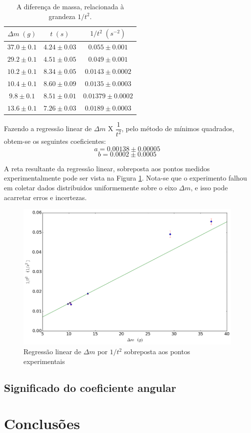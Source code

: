 \documentclass[12pt,a4paper]{article}
\begin{document}
\begin{table}[!htbp]
\centering
\def\arraystretch{1.5}
\caption{A diferença de massa, relacionada à grandeza $1/t^2$.}
\begin{tabular}{|c|c|c|}
\hline 
$\Delta m \; (g)$ & $t \; (s)$ & $1/t^2 \; (s^{-2})$ \\ 
\hline 
$37.0 \pm 0.1$ & $4.24 \pm 0.03 $ & $0.055 \pm 0.001 $  \\
\hline
$29.2 \pm 0.1$ & $4.51 \pm 0.05 $ & $0.049 \pm 0.001$ \\
\hline
$10.2 \pm 0.1$ & $8.34 \pm 0.05 $ & $0.0143 \pm 0.0002$\\
\hline
$10.4 \pm 0.1$ & $8.60 \pm 0.09 $ & $ 0.0135 \pm 0.0003 $\\
\hline
$9.8 \pm 0.1$ & $8.51 \pm 0.01 $ & $ 0.01379 \pm 0.0002 $\\
\hline
$13.6 \pm 0.1$ & $7.26 \pm 0.03 $ & $ 0.0189 \pm 0.0003 $ \\
\hline
\end{tabular} 
\label{linear}
\end{table}
Fazendo a regressão linear de $ \Delta m$ X $ \dfrac{1}{t^2} $, pelo método de mínimos quadrados, obtem-se os seguintes coeficientes: 
	$$ a = 0.00138 \pm 0.00005 $$
	$$ b = 0.0002 \pm 0.0005 $$

A reta resultante da regressão linear, sobreposta aos pontos medidos experimentalmente pode ser vista na Figura \ref{grafico}. Nota-se que o experimento falhou em coletar dados distribuidos uniformemente sobre o eixo $ \Delta m$, e isso pode acarretar erros e incertezas.

\begin{figure}
\includegraphics[scale=0.55]{grafico.png}
\caption{Regressão linear de $\Delta m$ por $1/t^2$ sobreposta aos pontos experimentais}
\label{grafico}
\end{figure}

\subsection{Significado do coeficiente angular}

\section{Conclusões}
\end{document}
